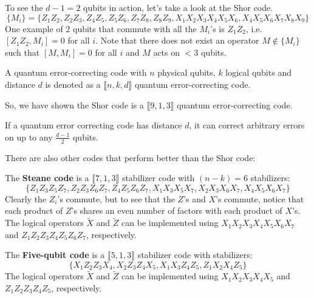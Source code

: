 \begin{example}
    To see the $d-1 = 2$ qubits in action, let's take a look at the Shor code.
    \[ \{M_i\} = \{ Z_1 Z_2, Z_2 Z_3, Z_4 Z_5, Z_5 Z_6, Z_7 Z_8, Z_8 Z_9, X_1 X_2 X_3 X_4 X_5 X_6, X_4 X_5 X_6 X_7 X_8 X_9 \}\]
    One example of 2 qubits that commute with all the $M_i$'s is $Z_1Z_2$, i.e. $[Z_1Z_2, M_i] = 0$ for all $i$. Note that there does not exist 
    an operator $M \not \in \{M_i\}$ such that $[M, M_i] = 0$ for all $i$ and $M$ acts on $<3$ qubits.
\end{example}

\begin{definition}
    A quantum error-correcting code with $n$ physical qubits, $k$ logical qubits and distance $d$ is denoted as a
    $\llbracket n, k, d \rrbracket$ quantum error-correcting code.
\end{definition}

So, we have shown the Shor code is a $\llbracket 9, 1, 3 \rrbracket$ quantum error-correcting code. 
\begin{theorem}
    If a quantum error correcting code has distance $d$, it can correct arbitrary errors on up to any $\frac{d-1}{2}$ qubits. 
\end{theorem}
There are also other codes that perform better than the Shor code:
\begin{example}
    The \textbf{Steane code} is a $\llbracket 7, 1, 3 \rrbracket$ stabilizer code with $(n-k) = 6$ stabilizers:
    \[ \{ Z_1 Z_3 Z_5 Z_7, Z_2 Z_3 Z_6 Z_7, Z_4 Z_5 Z_6 Z_7, X_1 X_3 X_5 X_7, X_2 X_3 X_6 X_7, X_4 X_5 X_6 X_7  \} \]
    Clearly the $Z_i$'s commute, but to see that the $Z$'s and $X$'s commute, notice that each product of $Z$'s shares an even number of factors with
    each product of $X$'s. The logical operators $\tilde{X}$ and $\tilde{Z}$ can be implemented using $X_1X_2X_3X_4X_5X_6X_7$ and $Z_1Z_2Z_3Z_4Z_5Z_6Z_7$, respectively.
\end{example}

\begin{example}
    The \textbf{Five-qubit code} is a $\llbracket 5, 1, 3 \rrbracket$ stabilizer code with stabilizers:
    \[ \{X_1 Z_2 Z_3 X_4, X_2 Z_3 Z_4 X_5, X_1 X_3 Z_4 Z_5, Z_1 X_2 X_4 Z_5\} \]
    The logical operators $\tilde{X}$ and $\tilde{Z}$ can be implemented using $X_1X_2X_3X_4X_5$ and $Z_1Z_2Z_3Z_4Z_5$, respectively.
\end{example}

